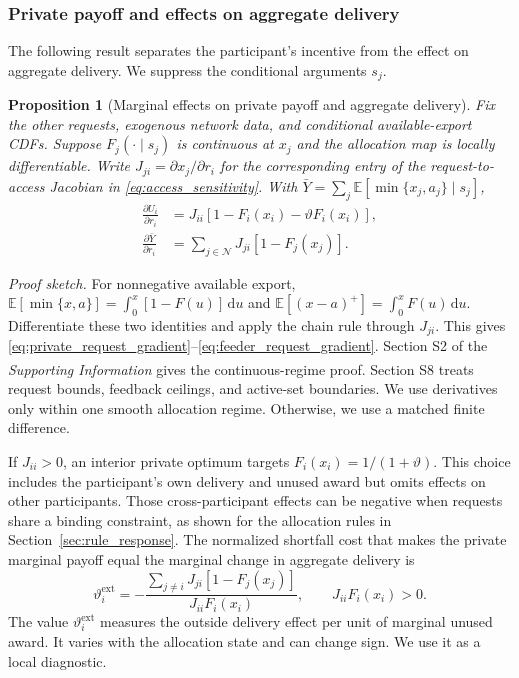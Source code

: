 \documentclass[twoside,twocolumn,9pt]{article}
\newtheorem{proposition}{Proposition}[section]
\newcommand{\suppref}{\textit{Supporting Information}\textsuperscript{\dag}}
\begin{document}
{\subsubsection{Private payoff and effects on aggregate delivery}

The following result separates the participant's incentive from the effect on
aggregate delivery. We suppress the conditional arguments $s_j$.

\begin{proposition}[Marginal effects on private payoff and aggregate delivery]
\label{prop:private_aggregate_request_gradient}
Fix the other requests, exogenous network data, and conditional available-export
CDFs. Suppose
$F_j(\cdot\mid s_j)$ is continuous at $x_j$ and the allocation map is locally
differentiable. Write $J_{ji}=\partial x_j/\partial r_i$ for the corresponding
entry of the request-to-access Jacobian in
\eqref{eq:access_sensitivity}. With
$\bar Y=\sum_j\mathbb E[\min\{x_j,a_j\}\mid s_j]$,
\begin{align}
\frac{\partial U_i}{\partial r_i}
&=J_{ii}\!\left[1-F_i(x_i)-\vartheta F_i(x_i)\right],
\label{eq:private_request_gradient}\\
\frac{\partial\bar Y}{\partial r_i}
&=\sum_{j\in\mathcal N}J_{ji}\left[1-F_j(x_j)\right].
\label{eq:feeder_request_gradient}
\end{align}
\end{proposition}
\noindent\textit{Proof sketch.}
For nonnegative available export,
$\mathbb E[\min\{x,a\}]=\int_0^x[1-F(u)]\,\mathrm du$ and
$\mathbb E[(x-a)^+]=\int_0^xF(u)\,\mathrm du$. Differentiate these two
identities and apply the chain rule through $J_{ji}$. This gives
\eqref{eq:private_request_gradient}--\eqref{eq:feeder_request_gradient}.
Section S2 of the \suppref{} gives the continuous-regime proof. Section S8 treats
request bounds, feedback ceilings, and active-set boundaries. We use derivatives
only within one smooth allocation regime. Otherwise, we use a matched finite
difference.

If $J_{ii}>0$, an interior private optimum targets
$F_i(x_i)=1/(1+\vartheta)$. This choice includes the participant's own delivery
and unused award but omits effects on other participants. Those cross-participant
effects can be negative when requests share a binding constraint, as shown for
the allocation rules in Section~\ref{sec:rule_response}. The normalized
shortfall cost that makes the private marginal payoff equal the marginal change
in aggregate delivery is
\begin{equation}
\vartheta_i^{\mathrm{ext}}
=-\frac{\sum_{j\ne i}J_{ji}[1-F_j(x_j)]}
{J_{ii}F_i(x_i)},
\qquad J_{ii}F_i(x_i)>0.
\label{eq:externality_equivalent_shortfall_cost}
\end{equation}
The value $\vartheta_i^{\mathrm{ext}}$ measures the outside delivery effect per
unit of marginal unused award. It varies with the allocation state and can
change sign. We use it as a local diagnostic.

}
\end{document}
